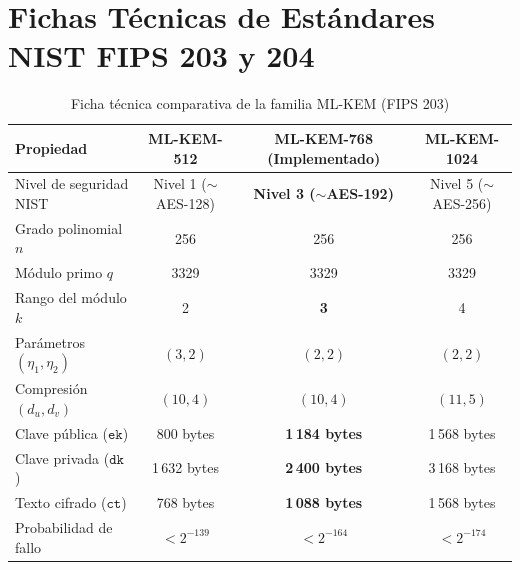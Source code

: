 \documentclass[11pt,a4paper,twoside,openright]{book}
\theoremstyle{plain}
\theoremstyle{definition}
\theoremstyle{remark}
\begin{document}
\chapter{Fichas T\'ecnicas de Est\'andares NIST FIPS 203 y 204}
\label{app:fichas_tecnicas}

\begin{table}[H]
\centering
\caption{Ficha t\'ecnica comparativa de la familia ML-KEM (FIPS 203)}
\label{tab:ficha_mlkem}
\begin{tabular}{lccc}
\toprule
\textbf{Propiedad} & \textbf{ML-KEM-512} & \textbf{ML-KEM-768 (Implementado)} & \textbf{ML-KEM-1024} \\
\midrule
Nivel de seguridad NIST & Nivel 1 ($\sim$AES-128) & \textbf{Nivel 3 ($\sim$AES-192)} & Nivel 5 ($\sim$AES-256) \\
Grado polinomial $n$ & 256 & 256 & 256 \\
M\'odulo primo $q$ & 3329 & 3329 & 3329 \\
Rango del m\'odulo $k$ & 2 & \textbf{3} & 4 \\
Par\'ametros $(\eta_1, \eta_2)$ & $(3, 2)$ & \textbf{$(2, 2)$} & $(2, 2)$ \\
Compresi\'on $(d_u, d_v)$ & $(10, 4)$ & \textbf{$(10, 4)$} & $(11, 5)$ \\
Clave p\'ublica ($\mathtt{ek}$) & 800 bytes & \textbf{1\,184 bytes} & 1\,568 bytes \\
Clave privada ($\mathtt{dk}$) & 1\,632 bytes & \textbf{2\,400 bytes} & 3\,168 bytes \\
Texto cifrado ($\mathtt{ct}$) & 768 bytes & \textbf{1\,088 bytes} & 1\,568 bytes \\
Probabilidad de fallo & $< 2^{-139}$ & \textbf{$< 2^{-164}$} & $< 2^{-174}$ \\
\bottomrule
\end{tabular}
\end{table}
\end{document}
